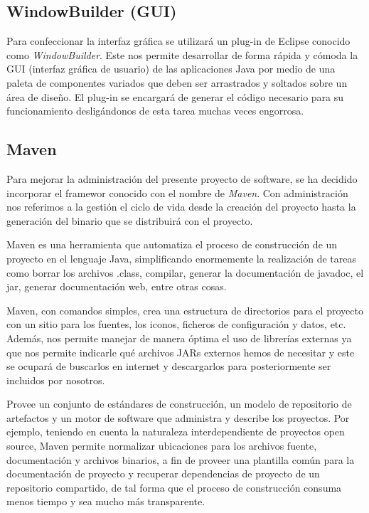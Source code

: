 \documentclass{book}
\begin{document}
\subsection{WindowBuilder (GUI)}

Para confeccionar la interfaz gráfica se utilizará un plug-in de Eclipse conocido como \textit{WindowBuilder}. Este nos permite desarrollar de forma rápida y cómoda la GUI (interfaz gráfica de usuario) de las aplicaciones Java por medio de una paleta de componentes variados que deben ser arrastrados y soltados sobre un área de diseño. El plug-in se encargará de generar el código necesario para su funcionamiento desligándonos de esta tarea muchas veces engorrosa.
\medskip


\subsection{Maven}

Para mejorar la administración del presente proyecto de software, se ha decidido incorporar el framewor conocido con el nombre de \textit{Maven}. Con administración nos referimos a la gestión el ciclo de vida desde la creación del proyecto hasta la generación del binario que se distribuirá con el proyecto.
\par
Maven es una herramienta que automatiza el proceso de construcción de un proyecto en el lenguaje Java, simplificando enormemente la realización de tareas como borrar los archivos .class, compilar, generar la documentación de javadoc, el jar, generar documentación web, entre otras cosas.
\par
Maven, con comandos simples, crea una estructura de directorios para el proyecto con un sitio para los fuentes, los iconos, ficheros de configuración y datos, etc. Además, nos permite manejar de manera óptima el uso de librerías externas ya que nos permite indicarle qué archivos JARs externos hemos de necesitar y este se ocupará de buscarlos en internet y descargarlos para posteriormente ser incluidos por nosotros.
\par
Provee un conjunto de estándares de construcción, un modelo de repositorio de artefactos y un motor de software que administra y describe los proyectos. Por ejemplo, teniendo en cuenta la naturaleza interdependiente de proyectos open source, Maven permite normalizar ubicaciones para los archivos fuente, documentación y archivos binarios, a fin de proveer una plantilla común para la documentación de proyecto y recuperar dependencias de proyecto de un repositorio compartido, de tal forma que el proceso de construcción consuma menos tiempo y sea mucho más transparente.
\medskip
\end{document}
